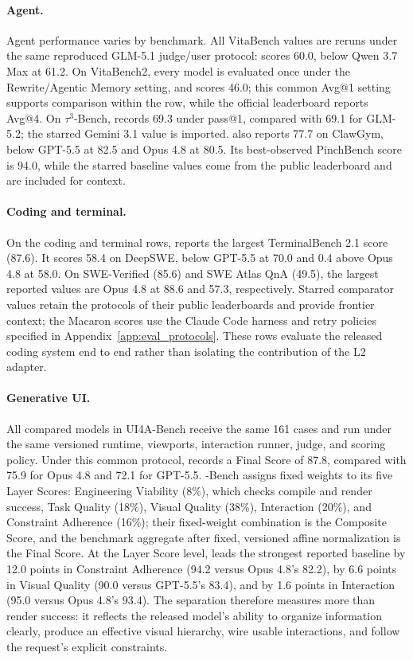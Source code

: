 \paragraph{Agent.}
Agent performance varies by benchmark. All VitaBench values are reruns under the same reproduced GLM-5.1 judge/user protocol: \venti{} scores 60.0, below Qwen 3.7 Max at 61.2. On VitaBench2, every model is evaluated once under the Rewrite/Agentic Memory setting, and \venti{} scores 46.0; this common Avg@1 setting supports comparison within the row, while the official leaderboard reports Avg@4. On $\tau^3$-Bench, \venti{} records 69.3 under pass@1, compared with 69.1 for GLM-5.2; the starred Gemini 3.1 value is imported. \venti{} also reports 77.7 on ClawGym, below GPT-5.5 at 82.5 and Opus 4.8 at 80.5. Its best-observed PinchBench score is 94.0, while the starred baseline values come from the public leaderboard and are included for context.

\paragraph{Coding and terminal.}
On the coding and terminal rows, \venti{} reports the largest TerminalBench 2.1 score (87.6). It scores 58.4 on DeepSWE, below GPT-5.5 at 70.0 and 0.4 above Opus 4.8 at 58.0. On SWE-Verified (85.6) and SWE Atlas QnA (49.5), the largest reported values are Opus 4.8 at 88.6 and 57.3, respectively. Starred comparator values retain the protocols of their public leaderboards and provide frontier context; the Macaron scores use the Claude Code harness and retry policies specified in Appendix~\ref{app:eval_protocols}. These rows evaluate the released coding system end to end rather than isolating the contribution of the L2 adapter.

\paragraph{Generative UI.}
All compared models in UI4A-Bench receive the same 161 cases and run under the same versioned \uifora{} runtime, viewports, interaction runner, judge, and scoring policy. Under this common protocol, \venti{} records a Final Score of 87.8, compared with 75.9 for Opus 4.8 and 72.1 for GPT-5.5. \uifora{}-Bench assigns fixed weights to its five Layer Scores: Engineering Viability (8\%), which checks compile and render success, Task Quality (18\%), Visual Quality (38\%), Interaction (20\%), and Constraint Adherence (16\%); their fixed-weight combination is the Composite Score, and the benchmark aggregate after fixed, versioned affine normalization is the Final Score. At the Layer Score level, \venti{} leads the strongest reported baseline by 12.0 points in Constraint Adherence (94.2 versus Opus 4.8's 82.2), by 6.6 points in Visual Quality (90.0 versus GPT-5.5's 83.4), and by 1.6 points in Interaction (95.0 versus Opus 4.8's 93.4). The separation therefore measures more than render success: it reflects the released model's ability to organize information clearly, produce an effective visual hierarchy, wire usable interactions, and follow the request's explicit constraints.

